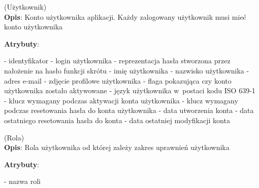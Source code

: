 \begin{enumerate}[label={\textbf{KAT/1/\protect\twodigits{\theenumi}}}, wide, labelwidth=!, labelindent=0pt, labelsep=0pt, series=reqs]
    \setlength\itemsep{1.75em}
    \label{kat:User} (Użytkownik)\\
    \indent\textbf{Opis}: Konto użytkownika aplikacji. Każdy zalogowany użytkownik musi mieć konto użytkownika
    \par
    \textbf{Atrybuty}:
    \begin{itemize}[series=atr, wide, align=left, leftmargin=190pt]
        \label{kat:User:id}- identyfikator
        \label{kat:User:login}- login użytkownika
        \label{kat:User:passwordHash}- reprezentacja hasła stworzona przez nałożenie na hasło funkcji skrótu
        \label{kat:User:firstName}- imię użytkownika
        \label{kat:User:lastName}- nazwisko użytkownika
        \label{kat:User:email}- adres e-mail
        \label{kat:User:image}- zdjęcie profilowe użytkownika
        \label{kat:User:activated}- flaga pokazująca czy konto użytkownika zostało aktywowane
        \label{kat:User:language}- język użytkownika w~postaci kodu ISO 639-1
        \label{kat:User:activationKey}- klucz wymagany podczas aktywacji konta użytkownika
        \label{kat:User:resetKey}- klucz wymagany podczas resetowania hasła do konta użytkownika
        \label{kat:User:createdDate}- data utworzenia konta
        \label{kat:User:resetDate}- data ostatniego resetowania hasła do konta
        \label{kat:User:lastModifiedDate}- data ostatniej modyfikacji konta
    \end{itemize}

    \label{kat:Authority} (Rola)\\
    \indent\textbf{Opis}: Rola użytkownika od której zależy zakres uprawnień użytkownika
    \par
    \textbf{Atrybuty}:
    \begin{itemize}[series=atr, wide, align=left, leftmargin=190pt]
        \label{kat:Authority:name}- nazwa roli
    \end{itemize}


\end{enumerate}

